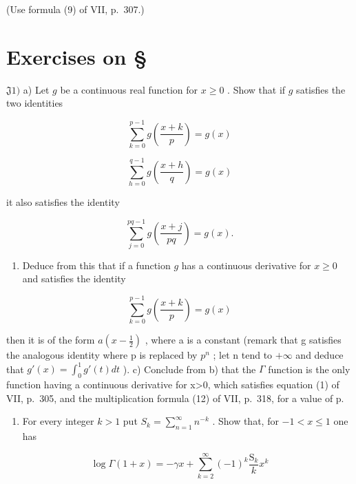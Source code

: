(Use formula (9) of VII, p.~307.)

\setcounter{exercisegroup}{1}
\section*{Exercises on \S{}}
{}

\(\mathfrak{J}1)\) a) Let \(g\) be a continuous real function for \(x \geqslant 0\) . Show that if \(g\) satisfies the two identities

\[
\sum_ {k = 0} ^ {p - 1} g \left(\frac {x + k}{p}\right) = g (x)
\]

\[
\sum_ {h = 0} ^ {q - 1} g \left(\frac {x + h}{q}\right) = g (x)
\]

it also satisfies the identity

\[
\sum_ {j = 0} ^ {p q - 1} g \left(\frac {x + j}{p q}\right) = g (x).
\]

\begin{enumerate}
\def\labelenumi{\alph{enumi})}
\setcounter{enumi}{1}
\tightlist
\item
  Deduce from this that if a function \(g\) has a continuous derivative for \(x \geqslant 0\) and satisfies the identity
\end{enumerate}

\[
\sum_ {k = 0} ^ {p - 1} g \left(\frac {x + k}{p}\right) = g (x)
\]

then it is of the form \(a(x-\frac{1}{2})\) , where a is a constant (remark that g satisfies the analogous identity where p is replaced by \(p^{n}\) ; let n tend to \(+\infty\) and deduce that \(g'(x)=\int_{0}^{1}g'(t)dt\) ). c) Conclude from b) that the \(\Gamma\) function is the only function having a continuous derivative for x\textgreater0, which satisfies equation (1) of VII, p.~305, and the multiplication formula (12) of VII, p.~318, for a value of p.

\begin{enumerate}
\def\labelenumi{\arabic{enumi})}
\setcounter{enumi}{1}
\tightlist
\item
  For every integer \(k > 1\) put \(S_k = \sum_{n=1}^{\infty} n^{-k}\) . Show that, for \(-1 < x \leqslant 1\) one has
\end{enumerate}

\[
\log \Gamma (1 + x) = - \gamma x + \sum_ {k = 2} ^ {\infty} (- 1) ^ {k} \frac {\mathrm{S} _ {k}}{k} x ^ {k}
\]

